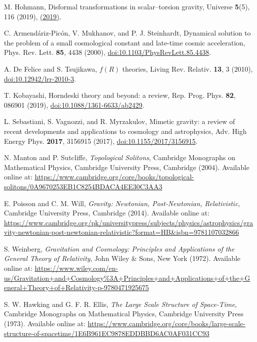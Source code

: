 \documentclass{article}
\begin{document}
\begin{thebibliography}{99}
M. Hohmann,
Disformal transformations in scalar–torsion gravity,
Universe \textbf{5}(5), 116 (2019),
\href{https://www.mdpi.com/2218-1997/5/7/167}{(2019)}.

C. Armendáriz-Picón, V. Mukhanov, and P. J. Steinhardt, Dynamical solution to the problem of a small cosmological constant and late-time cosmic acceleration, 
Phys. Rev. Lett. \textbf{85}, 4438 (2000),
\href{https://doi.org/10.1103/PhysRevLett.85.4438}{doi:10.1103/PhysRevLett.85.4438}.

A. De Felice and S. Tsujikawa, $f(R)$ theories, 
Living Rev. Relativ. \textbf{13}, 3 (2010),
\href{https://doi.org/10.12942/lrr-2010-3}{doi:10.12942/lrr-2010-3}.

T. Kobayashi, Horndeski theory and beyond: a review, 
Rep. Prog. Phys. \textbf{82}, 086901 (2019),
\href{https://doi.org/10.1088/1361-6633/ab2429}{doi:10.1088/1361-6633/ab2429}.

L. Sebastiani, S. Vagnozzi, and R. Myrzakulov, Mimetic gravity: a review of recent developments and applications to cosmology and astrophysics, 
Adv. High Energy Phys. \textbf{2017}, 3156915 (2017),
\href{https://doi.org/10.1155/2017/3156915}{doi:10.1155/2017/3156915}.

N. Manton and P. Sutcliffe,
\emph{Topological Solitons},
Cambridge Monographs on Mathematical Physics, Cambridge University Press, Cambridge (2004).
Available online at: \url{https://www.cambridge.org/core/books/topological-solitons/0A9670253EB1C8254BDACA4EE30C3AA3}

E. Poisson and C. M. Will,
\emph{Gravity: Newtonian, Post-Newtonian, Relativistic},
Cambridge University Press, Cambridge (2014).
Available online at: \url{https://www.cambridge.org/pk/universitypress/subjects/physics/astrophysics/gravity-newtonian-post-newtonian-relativistic?format=HB&isbn=9781107032866}


S. Weinberg,
\emph{Gravitation and Cosmology: Principles and Applications of the General Theory of Relativity},
John Wiley \& Sons, New York (1972).
Available online at: \url{https://www.wiley.com/en-us/Gravitation+and+Cosmology%3A+Principles+and+Applications+of+the+General+Theory+of+Relativity-p-9780471925675}

S. W. Hawking and G. F. R. Ellis,
\emph{The Large Scale Structure of Space-Time},
Cambridge Monographs on Mathematical Physics, Cambridge University Press (1973).
Available online at: \url{https://www.cambridge.org/core/books/large-scale-structure-of-spacetime/1E6B961EC9878EDDBBD6AC0AF031CC93}



\end{thebibliography}
\end{document}
